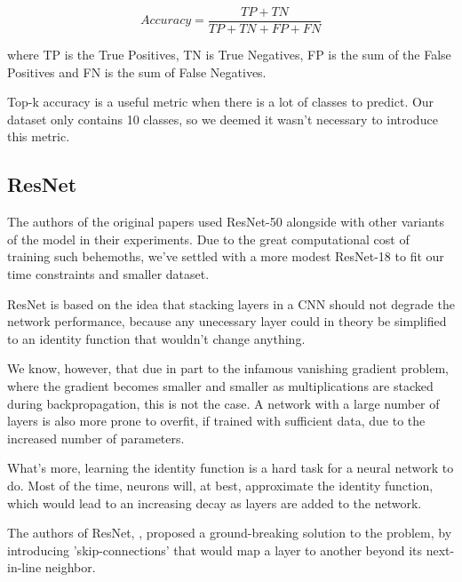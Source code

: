 \documentclass{article}
\begin{document}
$$ Accuracy = \frac{TP + TN}{TP + TN + FP + FN}  $$ \medskip \par

\noindent
where TP is the True Positives, TN is True Negatives, FP is the sum of the False Positives
and FN is the sum of False Negatives. \medskip \par

\noindent
Top-k accuracy is a useful metric when there is a lot of classes to predict. Our dataset only
contains 10 classes, so we deemed it wasn't necessary to introduce this metric.

\subsection{ResNet}

The authors of the original papers used ResNet-50 
alongside with other variants of the model in their experiments. 
Due to the great computational cost of training such behemoths, 
we've settled with a more modest ResNet-18 to fit our time constraints and smaller dataset. \medskip \par

\noindent
ResNet is based on the idea that stacking layers in a CNN should not degrade the network performance,
because any unecessary layer could in theory be simplified 
to an identity function that wouldn't change anything. \medskip \par

\noindent
We know, however, that due in part to the infamous vanishing gradient problem, 
where the gradient becomes smaller and smaller as multiplications are stacked during backpropagation, 
this is not the case. 
A network with a large number of layers is also more prone to overfit, 
if trained with sufficient data, due to the increased number of parameters. \medskip \par

\noindent
What's more, learning the identity function is a hard task for a neural network to do. 
Most of the time, neurons will, at best, approximate the identity function, 
which would lead to an increasing decay as layers are added to the network. \medskip \par

\noindent
The authors of ResNet, \cite{resnet2015}, proposed a ground-breaking solution to the problem, 
by introducing 'skip-connections' 
that would map a layer to another beyond its next-in-line neighbor. \medskip \par
\end{document}
